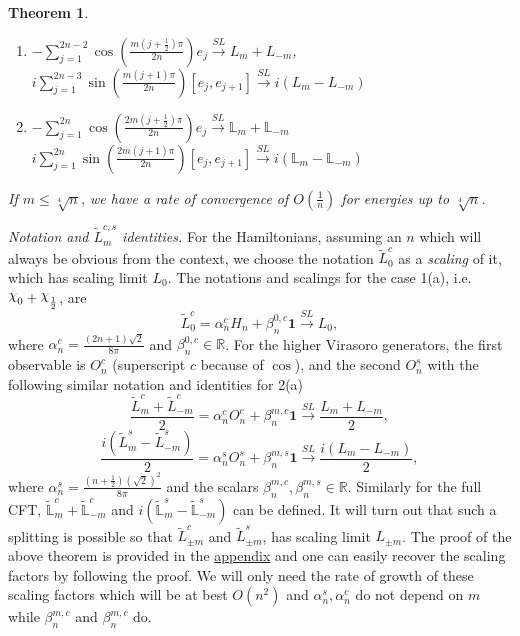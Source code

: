 \documentclass[twoside,11pt,titlepage]{amsart}
\renewcommand{\=}[1]{\stackrel{#1}{=}} %
\newtheorem{thm}{Theorem}[section]
\theoremstyle{definition}
\theoremstyle{remark}
\DeclareRobustCommand{\rchi}{{\mathpalette\irchi\relax}}
\newcommand{\irchi}[2]{\raisebox{\depth}{$#1\chi$}}
\begin{document}
\begin{thm}
\begin{enumerate}
    \item $-\sum_{j=1}^{2n-2}\cos(\frac{m(j+\frac{1}{2})\pi}{2n})e_j\xrightarrow{SL}L_m+L_{-m}$,\\
    $i\sum_{j=1}^{2n-3}\sin(\frac{m(j+1)\pi}{2n})[e_j,e_{j+1}]\xrightarrow{SL}i(L_m-L_{-m})$
    
    \item    $-\sum_{j=1}^{2n}\cos(\frac{2m(j+\frac{1}{2})\pi}{2n})e_j\xrightarrow{SL}\mathbb{L}_m+\mathbb{L}_{-m}$ \\
    $i\sum_{j=1}^{2n}\sin(\frac{2m(j+1)\pi}{2n})[e_j,e_{j+1}]\xrightarrow{SL}i(\mathbb{L}_m-\mathbb{L}_{-m})$   

\end{enumerate}
If $m \le \sqrt[4]{n}$, we have a rate of convergence of $O(\frac{1}{n})$ for energies up to $\sqrt[4]{n}$.
\end{thm}
\textit{Notation and $\widetilde{L}_m^{c,s}$ identities.}\label{identities} For the Hamiltonians, assuming an $n$ which will always be obvious from the context, we choose the notation $\widetilde{L}_0^c$ as a \textit{scaling} of it, which has scaling limit $L_0$. The notations and scalings for the case 1(a), i.e. $\rchi_0+\rchi_\frac{1}{2}$, are
$$\widetilde{L}_0^c=\alpha_n^cH_n + \beta_n^{0,c}\textbf{1} \xrightarrow{SL} L_0,$$
where $\alpha_n^c=\frac{(2n+1)\sqrt{2}}{8\pi}$ and $\beta_n^{0,c} \in \mathbb{R}$. For the higher Virasoro generators, the first observable is $O_n^c$ (superscript $c$ because of $\cos$), and the second $O_n^s$ with the following similar notation and identities for 2(a)
$$\frac{\widetilde{L}_m^c+\widetilde{L}_{-m}^c}{2}=\alpha_n^cO_n^c+\beta_n^{m,c}\textbf{1} \xrightarrow{SL} \frac{L_m+L_{-m}}{2},$$
$$ \frac{i(\widetilde{L}_m^s-\widetilde{L}_{-m}^s)}{2}=\alpha_n^sO_n^s+\beta_n^{m,s}\textbf{1} \xrightarrow{SL} \frac{i(L_m-L_{-m})}{2},$$  
where $\alpha_n^s=\frac{(n+\frac{1}{2})(\sqrt{2})^2}{8\pi}$ and the scalars $\beta_n^{m,c},\beta_n^{m,s} \in \mathbb{R}$. Similarly for the full CFT, $\widetilde{\mathbb{L}}_m^c+\widetilde{\mathbb{L}}_{-m}^c$ and $i(\widetilde{\mathbb{L}}_m^s-\widetilde{\mathbb{L}}_{-m}^s)$ can be defined. It will turn out that such a splitting is possible so that $\widetilde{L}_{\pm m}^c$ and $\widetilde{L}_{\pm m}^s$, has scaling limit $L_{\pm m}$. The proof of the above theorem is provided in the \hyperref[A.1]{appendix} and one can easily recover the scaling factors by following the proof. We will only need the rate of growth of these scaling factors which will be at best $O(n^2)$ and $\alpha_n^s,\alpha_n^c$ do not depend on $m$ while $\beta_n^{m,c}$ and $\beta_n^{m,c}$ do.
\end{document}
